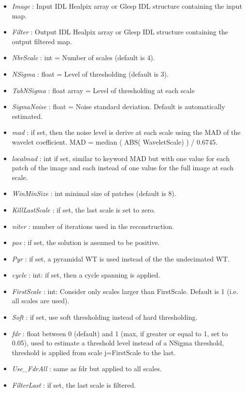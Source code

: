 \begin{itemize}
\item {\em Image} : Input IDL Healpix array or Glesp IDL structure containing the input map.
\item {\em Filter} : Output IDL Healpix array or Glesp IDL structure containing the output filtered map.
\item {\em NbrScale} : int = Number of scales (default is 4).
\item {\em NSigma} : float = Level of thresholding (default is 3).
\item {\em TabNSigma} : float array = Level of thresholding at each scale
\item {\em SigmaNoise} : float = Noise standard deviation. Default is automatically estimated.
\item {\em mad} : if set, then the noise level is derive at each scale using the MAD of the wavelet coefficient. MAD = median ( ABS( WaveletScale) ) / 0.6745.
\item {\em localmad} : int if set, similar to keyword MAD but with one value for each patch of the image and each instead of one value for the full image at each scale.
\item {\em WinMinSize} : int minimal size of patches (default is 8).
\item {\em KillLastScale} : if set, the last scale is set to zero.
\item {\em niter} : number of iterations used in the reconstruction.
\item {\em pos} : if set, the solution is assumed to be positive.
\item {\em Pyr} : if set, a pyramidal WT is used instead of the the undecimated WT.
\item {\em cycle} : int: if set, then a cycle spanning is applied.
\item {\em FirstScale} : int: Consider only scales larger than FirstScale. Default is 1 (i.e. all scales are used).
\item {\em Soft} : if set, use soft thresholding instead of hard thresholding.
\item {\em fdr} : float between 0 (default) and 1 (max, if greater or equal to 1, set to 0.05), used to estimate a threshold level 
instead of a NSigma threshold, threshold is applied from scale j=FirstScale to the last.
\item {\em Use\_FdrAll} : same as fdr but applied to all scales.
\item {\em FilterLast} : if set, the last scale is filtered.

\end{itemize}
